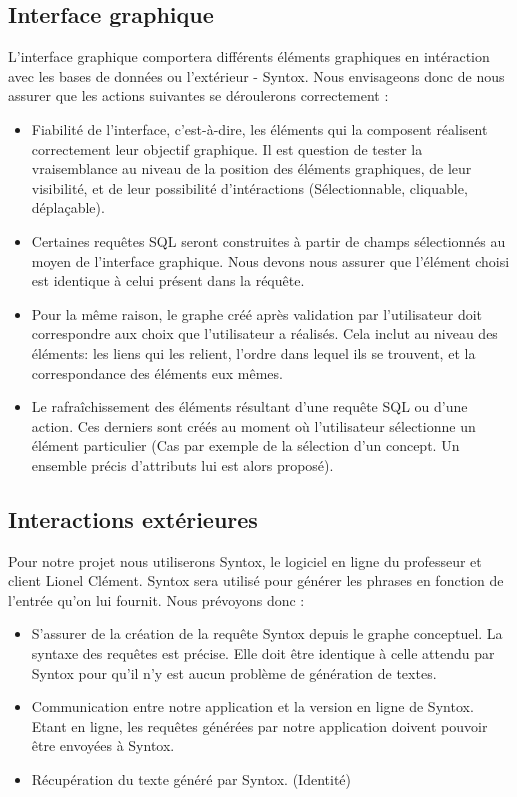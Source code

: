 \documentclass[12pt]{report}
\begin{document}
\subsection{Interface graphique}

L'interface graphique comportera différents éléments graphiques en intéraction avec les bases de données ou l'extérieur - Syntox. Nous envisageons donc de nous assurer que les actions suivantes se déroulerons correctement :

	\begin{itemize}
	
	\item Fiabilité de l'interface, c'est-à-dire, les éléments qui la composent réalisent correctement leur objectif graphique. Il est question de tester la vraisemblance au niveau de la position des éléments graphiques, de leur visibilité, et de leur possibilité d'intéractions (Sélectionnable, cliquable, déplaçable). 
	\item Certaines requêtes SQL seront construites à partir de champs sélectionnés au moyen de l'interface graphique. Nous devons nous assurer que l'élément choisi est identique à celui présent dans la réquête.
	\item Pour la même raison, le graphe créé après validation par l'utilisateur doit correspondre aux choix que l'utilisateur a réalisés. Cela inclut au niveau des éléments: les liens qui les relient, l'ordre dans lequel ils se trouvent, et la correspondance des éléments eux mêmes.
	\item Le rafraîchissement des éléments résultant d'une requête SQL ou d'une action. Ces derniers sont créés au moment où l'utilisateur sélectionne un élément particulier (Cas par exemple de la sélection d'un concept. Un ensemble précis d'attributs lui est alors proposé).

	\end{itemize}

\subsection{Interactions extérieures}

Pour notre projet nous utiliserons Syntox, le logiciel en ligne du professeur et client Lionel Clément. Syntox sera utilisé pour générer les phrases en fonction de l'entrée qu'on lui fournit. 
Nous prévoyons donc :

	\begin{itemize}
	
	\item S'assurer de la création de la requête Syntox depuis le graphe conceptuel. La syntaxe des requêtes est précise. Elle doit être identique à celle attendu par Syntox pour qu'il n'y est aucun problème de génération de textes.
	\item Communication entre notre application et la version en ligne de Syntox. Etant en ligne, les requêtes générées par notre application doivent pouvoir être envoyées à Syntox.
	\item Récupération du texte généré par Syntox. (Identité)

	\end{itemize}
	
\end{document}
